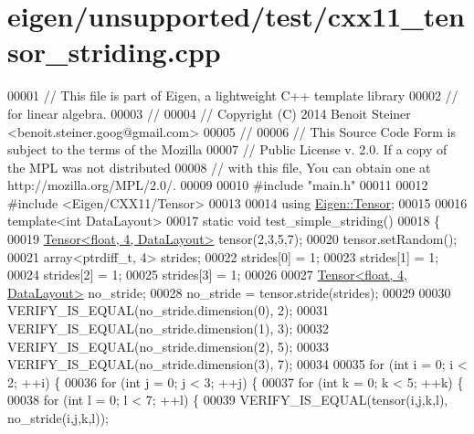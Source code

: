 \hypertarget{eigen_2unsupported_2test_2cxx11__tensor__striding_8cpp_source}{}\section{eigen/unsupported/test/cxx11\+\_\+tensor\+\_\+striding.cpp}
\label{eigen_2unsupported_2test_2cxx11__tensor__striding_8cpp_source}

\begin{DoxyCode}
00001 \textcolor{comment}{// This file is part of Eigen, a lightweight C++ template library}
00002 \textcolor{comment}{// for linear algebra.}
00003 \textcolor{comment}{//}
00004 \textcolor{comment}{// Copyright (C) 2014 Benoit Steiner <benoit.steiner.goog@gmail.com>}
00005 \textcolor{comment}{//}
00006 \textcolor{comment}{// This Source Code Form is subject to the terms of the Mozilla}
00007 \textcolor{comment}{// Public License v. 2.0. If a copy of the MPL was not distributed}
00008 \textcolor{comment}{// with this file, You can obtain one at http://mozilla.org/MPL/2.0/.}
00009 
00010 \textcolor{preprocessor}{#include "main.h"}
00011 
00012 \textcolor{preprocessor}{#include <Eigen/CXX11/Tensor>}
00013 
00014 \textcolor{keyword}{using} \hyperlink{class_eigen_1_1_tensor}{Eigen::Tensor};
00015 
00016 \textcolor{keyword}{template}<\textcolor{keywordtype}{int} DataLayout>
00017 \textcolor{keyword}{static} \textcolor{keywordtype}{void} test\_simple\_striding()
00018 \{
00019   \hyperlink{class_eigen_1_1_tensor}{Tensor<float, 4, DataLayout>} tensor(2,3,5,7);
00020   tensor.setRandom();
00021   array<ptrdiff\_t, 4> strides;
00022   strides[0] = 1;
00023   strides[1] = 1;
00024   strides[2] = 1;
00025   strides[3] = 1;
00026 
00027   \hyperlink{class_eigen_1_1_tensor}{Tensor<float, 4, DataLayout>} no\_stride;
00028   no\_stride = tensor.stride(strides);
00029 
00030   VERIFY\_IS\_EQUAL(no\_stride.dimension(0), 2);
00031   VERIFY\_IS\_EQUAL(no\_stride.dimension(1), 3);
00032   VERIFY\_IS\_EQUAL(no\_stride.dimension(2), 5);
00033   VERIFY\_IS\_EQUAL(no\_stride.dimension(3), 7);
00034 
00035   \textcolor{keywordflow}{for} (\textcolor{keywordtype}{int} i = 0; i < 2; ++i) \{
00036     \textcolor{keywordflow}{for} (\textcolor{keywordtype}{int} j = 0; j < 3; ++j) \{
00037       \textcolor{keywordflow}{for} (\textcolor{keywordtype}{int} k = 0; k < 5; ++k) \{
00038         \textcolor{keywordflow}{for} (\textcolor{keywordtype}{int} l = 0; l < 7; ++l) \{
00039           VERIFY\_IS\_EQUAL(tensor(i,j,k,l), no\_stride(i,j,k,l));

\end{DoxyCode}
